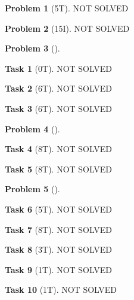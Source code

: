 \documentclass[11pt,twoside]{article}
\theoremstyle{definition}
\newtheorem{amsproblem}{Problem}
\newtheorem{amssubproblem}{Task}[amsproblem]
\newenvironment{problem}[1][]{%
  \begin{amsproblem}[#1]
  }{%
  \end{amsproblem}
}
\newenvironment{subproblem}[1][]{%
  \begin{amssubproblem}[#1]
  }{%
  \end{amssubproblem}
}
\newcommand{\TP}[1]{#1T}
\newcommand{\IP}[1]{#1I}
\begin{document}
\begin{problem}[\TP{5}]
  NOT SOLVED %
\end{problem}

\noindent
\hrulefill

\begin{problem}[\IP{15}]
  NOT SOLVED %
\end{problem}

\noindent
\hrulefill

\begin{problem}
  \begin{subproblem}[\TP{0}]
    NOT SOLVED %
  \end{subproblem}
  \begin{subproblem}[\TP{6}]
    NOT SOLVED %
  \end{subproblem}
  \begin{subproblem}[\TP{6}]
    NOT SOLVED %
  \end{subproblem}
\end{problem}

\noindent
\hrulefill

\begin{problem}
  \begin{subproblem}[\TP{8}]
    NOT SOLVED %
  \end{subproblem}
  \begin{subproblem}[\TP{8}]
    NOT SOLVED %
  \end{subproblem}
\end{problem}

\noindent
\hrulefill

\begin{problem}
  \begin{subproblem}[\TP{5}]
    NOT SOLVED %
  \end{subproblem}
  \begin{subproblem}[\TP{8}]
    NOT SOLVED %
  \end{subproblem}
  \begin{subproblem}[\TP{3}]
    NOT SOLVED %
  \end{subproblem}
  \begin{subproblem}[\TP{1}]
    NOT SOLVED %
  \end{subproblem}
  \begin{subproblem}[\TP{1}]
    NOT SOLVED %
  \end{subproblem}
\end{problem}
\end{document}
